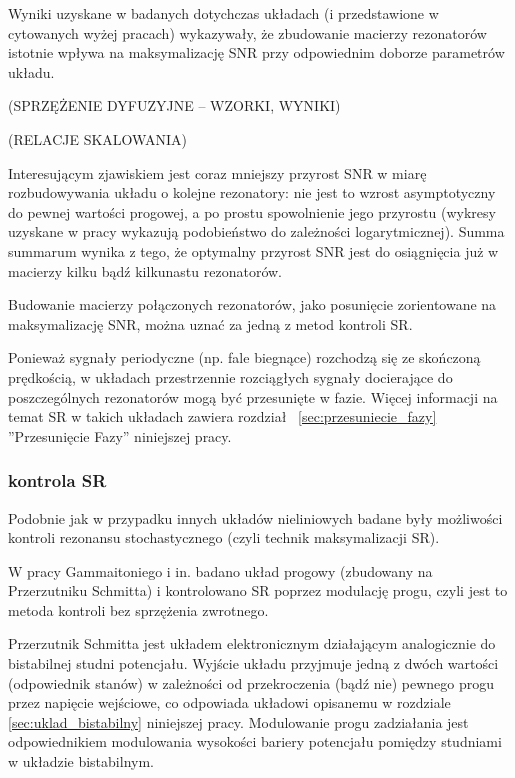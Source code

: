   Wyniki uzyskane w badanych dotychczas układach (i przedstawione w cytowanych wyżej pracach) wykazywały, że zbudowanie macierzy rezonatorów istotnie wpływa na maksymalizację SNR przy odpowiednim doborze parametrów układu.

  (SPRZĘŻENIE DYFUZYJNE -- WZORKI, WYNIKI)

  (RELACJE SKALOWANIA)

  Interesującym zjawiskiem jest coraz mniejszy przyrost SNR w miarę rozbudowywania układu o kolejne rezonatory: nie jest to wzrost asymptotyczny do pewnej wartości progowej, a po prostu spowolnienie jego przyrostu (wykresy uzyskane w pracy \cite{lindner_meadows} wykazują podobieństwo do zależności logarytmicznej). Summa summarum wynika z tego, że optymalny przyrost SNR jest do osiągnięcia już w macierzy kilku bądź kilkunastu rezonatorów.

  Budowanie macierzy połączonych rezonatorów, jako posunięcie zorientowane na maksymalizację SNR, można uznać za jedną z metod kontroli SR.


  Ponieważ sygnały periodyczne (np. fale biegnące) rozchodzą się ze skończoną prędkością, w układach przestrzennie rozciągłych sygnały docierające do poszczególnych rezonatorów mogą być przesunięte w fazie. Więcej informacji na temat SR w takich układach zawiera rozdział ~\ref{sec:przesuniecie_fazy} ''Przesunięcie Fazy'' niniejszej pracy.

  \subsubsection{kontrola SR}
  
  Podobnie jak w przypadku innych układów nieliniowych badane były możliwości kontroli rezonansu stochastycznego (czyli technik maksymalizacji SR). 

  W pracy Gammaitoniego i in. \cite{gammaitoni} badano układ progowy (zbudowany na Przerzutniku Schmitta) i kontrolowano SR poprzez modulację progu, czyli jest to metoda kontroli bez sprzężenia zwrotnego. 

  Przerzutnik Schmitta jest układem elektronicznym działającym analogicznie do bistabilnej studni potencjału. Wyjście układu przyjmuje jedną z dwóch wartości (odpowiednik stanów) w zależności od przekroczenia (bądź nie) pewnego progu przez napięcie wejściowe, co odpowiada układowi opisanemu w rozdziale \ref{sec:uklad_bistabilny} niniejszej pracy. Modulowanie progu zadziałania jest odpowiednikiem modulowania wysokości bariery potencjału pomiędzy studniami w układzie bistabilnym.

